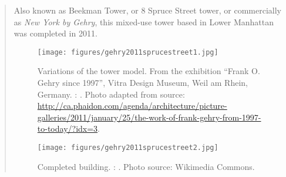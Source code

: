 			
\clearpage
{}
		\begin{quote}
		\small
		Also known as Beekman Tower, or 8 Spruce Street tower, or commercially as {\em New York by Gehry},
		this mixed-use tower based in Lower Manhattan was completed in 2011. 
		\begin{figure}[htb]
		\begin{center}
		\texttt{[image: figures/gehry2011sprucestreet1.jpg]}
		\caption{
		Variations of the tower model.
		From the exhibition ``Frank O. Gehry since 1997'', Vitra Design Museum, Weil am Rhein, Germany.
		\citeauthor{gehry2011sprucestreet}: 
		\cite{gehry2011sprucestreet}.
		Photo adapted from source: 
		\url{http://ca.phaidon.com/agenda/architecture/picture-galleries/2011/january/25/the-work-of-frank-gehry-from-1997-to-today/?idx=3}.
		}		
		\label{fig:gehry2011sprucestreet}
		\end{center}
		\end{figure}		
		
		\begin{figure}[htb]
		\begin{center}
		\texttt{[image: figures/gehry2011sprucestreet2.jpg]}
		\caption{
		Completed building.
		\citeauthor{gehry2011sprucestreet}: 
		\cite{gehry2011sprucestreet}.
		Photo source: Wikimedia Commons.
		}		
		\label{fig:gehry2011sprucestreet2}
		\end{center}
		\end{figure}		
		
		\end{quote}

		

						